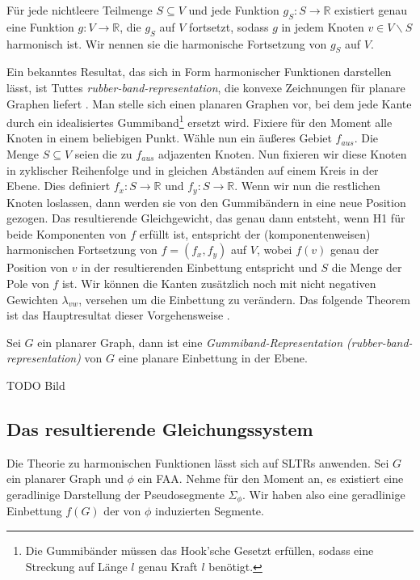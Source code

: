 \begin{theorem}\cite[Theorem 3.1.2]{lov99}\label{harmonic_uni}
Für jede nichtleere Teilmenge $S \subseteq V$ und jede Funktion $g_S:S\to\mathbb{R}$ existiert genau eine Funktion $g:V\to\mathbb{R}$, die $g_S$ auf $V$ fortsetzt, sodass $g$ in jedem Knoten $v\in V \backslash S$ harmonisch ist. Wir nennen sie die harmonische Fortsetzung von $g_S$ auf $V$.
\end{theorem}

Ein bekanntes Resultat, das sich in Form harmonischer Funktionen darstellen lässt, ist Tuttes \textit{rubber-band-representation}, die konvexe Zeichnungen für planare Graphen liefert \cite{tutte63}. Man stelle sich einen planaren Graphen vor, bei dem jede Kante durch ein idealisiertes Gummiband\footnote{Die Gummibänder müssen das Hook'sche Gesetzt erfüllen, sodass eine Streckung auf Länge $l$ genau Kraft $l$ benötigt.} ersetzt wird. Fixiere für den Moment alle Knoten in einem beliebigen Punkt. Wähle nun ein äußeres Gebiet $f_{aus}$. Die Menge $S\subseteq V$ seien die zu $f_{aus}$ adjazenten Knoten. Nun fixieren wir diese Knoten in zyklischer Reihenfolge und in gleichen Abständen auf einem Kreis in der Ebene. Dies definiert $f_x:S \to \mathbb{R}$ und  $f_y:S \to \mathbb{R}$. Wenn wir nun die restlichen Knoten loslassen, dann werden sie von den Gummibändern in eine neue Position gezogen. Das resultierende Gleichgewicht, das genau dann entsteht, wenn H1 für beide Komponenten von $f$ erfüllt ist, entspricht der (komponentenweisen) harmonischen Fortsetzung von $f=(f_x,f_y)$  auf $V$, wobei $f(v)$ genau der Position von $v$ in der resultierenden Einbettung entspricht und $S$ die Menge der Pole von $f$ ist. Wir können die Kanten zusätzlich noch mit nicht negativen Gewichten $\lambda_{vw}$, versehen um die Einbettung zu verändern. Das folgende Theorem ist das Hauptresultat dieser Vorgehensweise \cite{tutte63}.

\begin{theorem}\label{theo_rubber}
Sei $G$ ein planarer Graph, dann ist eine \textit{Gummiband-Representation (rubber-band-representation)} von $G$ eine planare Einbettung in der Ebene.
\end{theorem}

TODO Bild

\subsection{Das resultierende Gleichungssystem}\label{the_equations}

Die Theorie zu harmonischen Funktionen lässt sich auf SLTRs anwenden. Sei $G$ ein planarer Graph und $\phi$ ein FAA. Nehme für den Moment an, es existiert eine geradlinige Darstellung der Pseudosegmente $\Sigma_{\phi}$. Wir haben also eine geradlinige Einbettung $f(G)$ der von $\phi$ induzierten Segmente. 

